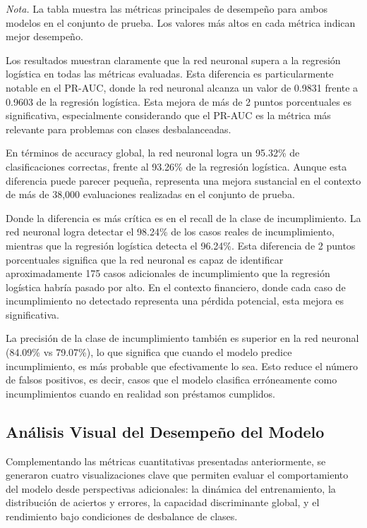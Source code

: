 \documentclass[12pt,a4paper]{article}
\begin{document}
\textit{Nota.} La tabla muestra las métricas principales de desempeño para ambos modelos en el conjunto de prueba. Los valores más altos en cada métrica indican mejor desempeño.

Los resultados muestran claramente que la red neuronal supera a la regresión logística en todas las métricas evaluadas. Esta diferencia es particularmente notable en el PR-AUC, donde la red neuronal alcanza un valor de 0.9831 frente a 0.9603 de la regresión logística. Esta mejora de más de 2 puntos porcentuales es significativa, especialmente considerando que el PR-AUC es la métrica más relevante para problemas con clases desbalanceadas.

En términos de accuracy global, la red neuronal logra un 95.32\% de clasificaciones correctas, frente al 93.26\% de la regresión logística. Aunque esta diferencia puede parecer pequeña, representa una mejora sustancial en el contexto de más de 38,000 evaluaciones realizadas en el conjunto de prueba.

Donde la diferencia es más crítica es en el recall de la clase de incumplimiento. La red neuronal logra detectar el 98.24\% de los casos reales de incumplimiento, mientras que la regresión logística detecta el 96.24\%. Esta diferencia de 2 puntos porcentuales significa que la red neuronal es capaz de identificar aproximadamente 175 casos adicionales de incumplimiento que la regresión logística habría pasado por alto. En el contexto financiero, donde cada caso de incumplimiento no detectado representa una pérdida potencial, esta mejora es significativa.

La precisión de la clase de incumplimiento también es superior en la red neuronal (84.09\% vs 79.07\%), lo que significa que cuando el modelo predice incumplimiento, es más probable que efectivamente lo sea. Esto reduce el número de falsos positivos, es decir, casos que el modelo clasifica erróneamente como incumplimientos cuando en realidad son préstamos cumplidos.

\subsection{Análisis Visual del Desempeño del Modelo}

Complementando las métricas cuantitativas presentadas anteriormente, se generaron cuatro visualizaciones clave que permiten evaluar el comportamiento del modelo desde perspectivas adicionales: la dinámica del entrenamiento, la distribución de aciertos y errores, la capacidad discriminante global, y el rendimiento bajo condiciones de desbalance de clases.
\end{document}
